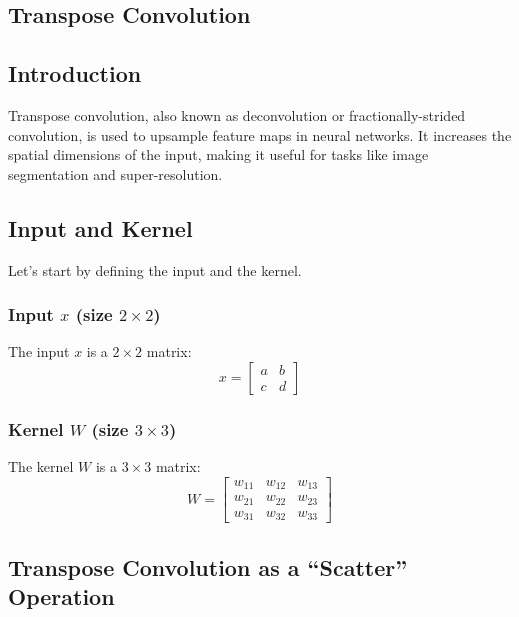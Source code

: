 \begin{notechapter}
\chapter{Transpose Convolution}\label{ch:transpose-convolution}

\section{Introduction}
Transpose convolution, also known as deconvolution or
fractionally-strided convolution, is used to upsample
feature maps in neural networks. It increases the spatial
dimensions of the input, making it useful for tasks like
image segmentation and super-resolution.

\section{Input and Kernel}
Let’s start by defining the input and the kernel.

\subsection{Input \( x \) (size \( 2 \times 2 \))}
The input \( x \) is a \( 2 \times 2 \) matrix:
\[
x = \begin{bmatrix}
a & b \\
c & d
\end{bmatrix}
\]

\subsection{Kernel \( W \) (size \( 3 \times 3 \))}
The kernel \( W \) is a \( 3 \times 3 \) matrix:
\[
W = \begin{bmatrix}
w_{11} & w_{12} & w_{13} \\
w_{21} & w_{22} & w_{23} \\
w_{31} & w_{32} & w_{33}
\end{bmatrix}
\]

\section{Transpose Convolution as a ``Scatter'' Operation}


\end{notechapter}
